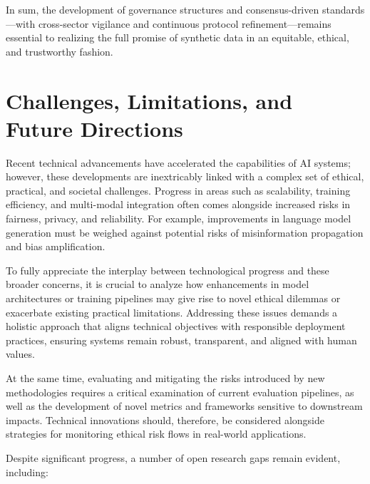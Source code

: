 \documentclass[sigconf]{acmart}
\begin{document}
In sum, the development of governance structures and consensus-driven standards—with cross-sector vigilance and continuous protocol refinement—remains essential to realizing the full promise of synthetic data in an equitable, ethical, and trustworthy fashion.

\section{Challenges, Limitations, and Future Directions}

Recent technical advancements have accelerated the capabilities of AI systems; however, these developments are inextricably linked with a complex set of ethical, practical, and societal challenges. Progress in areas such as scalability, training efficiency, and multi-modal integration often comes alongside increased risks in fairness, privacy, and reliability. For example, improvements in language model generation must be weighed against potential risks of misinformation propagation and bias amplification.

To fully appreciate the interplay between technological progress and these broader concerns, it is crucial to analyze how enhancements in model architectures or training pipelines may give rise to novel ethical dilemmas or exacerbate existing practical limitations. Addressing these issues demands a holistic approach that aligns technical objectives with responsible deployment practices, ensuring systems remain robust, transparent, and aligned with human values.

At the same time, evaluating and mitigating the risks introduced by new methodologies requires a critical examination of current evaluation pipelines, as well as the development of novel metrics and frameworks sensitive to downstream impacts. Technical innovations should, therefore, be considered alongside strategies for monitoring ethical risk flows in real-world applications.

Despite significant progress, a number of open research gaps remain evident, including:
\end{document}
